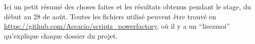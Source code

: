 Ici un petit résumé des choses faites et les résultats obtenus pendant le stage, du début au 28 de août. Toutes les fichiers utilisé peuvent être trouvé en \url{https://github.com/Accacio/scripts_powerfactory}, où il y a un ``lisezmoi'' qu'explique chaque dossier du projet.